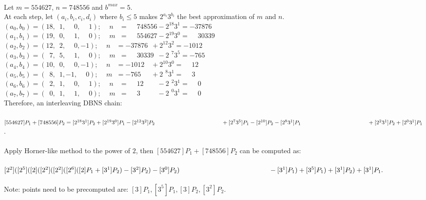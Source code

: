  \\
Let $m = 554627$, $n = 748556$ and $b^{max} = 5$. \\
At each step, let $(a_i,b_i,c_i,d_i)$ where $b_i \le 5$ makes $2^{a_i}3^{b_i}$ the best approximation of $m$ and $n$. \\
$(a_0,b_0) = (18,\phantom{0}1,\phantom{-}0,\phantom{-}1)$;		$\quad n\phantom{m} = \phantom{-}748556			- 2^{18}3^{1}		= -37876$ \\
$(a_1,b_1) = (19,\phantom{0}0,\phantom{-}1,\phantom{-}0)$;		$\quad m\phantom{n} = \phantom{-}554627			- 2^{19}3^{0}		= \phantom{-}30339$ \\
$(a_2,b_2) = (12,\phantom{0}2,\phantom{-}0,-1)$;			$\quad n\phantom{m} = -37876\phantom{0}			+ 2^{12}3^{2}		= -1012$ \\
$(a_3,b_3) = (\phantom{0}7,\phantom{0}5,\phantom{-}1,\phantom{-}0)$; 	$\quad m\phantom{n} = \phantom{-}30339\phantom{0}	- 2^{\phantom{0}7}3^{5} = -765$ \\
$(a_4,b_4) = (10,\phantom{0}0,\phantom{-}0,-1)$;			$\quad n\phantom{m}=  -1012\phantom{00}			+ 2^{10}3^{0}		= \phantom{-}12$ \\
$(a_5,b_5) = (\phantom{0}8,\phantom{0}1,-1,\phantom{-}0)$; 		$\quad m\phantom{n}=  -765\phantom{000}			+ 2^{\phantom{0}8}3^{1} = \phantom{-}3$ \\
$(a_6,b_6) = (\phantom{0}2,\phantom{0}1,\phantom{-}0,\phantom{-}1)$; 	$\quad n\phantom{m}= \phantom{-}12\phantom{0000}	- 2^{\phantom{0}2}3^{1} = \phantom{-}0$ \\
$(a_7,b_7) = (\phantom{0}0,\phantom{0}1,\phantom{-}1,\phantom{-}0)$; 	$\quad m\phantom{n}= \phantom{-}3\phantom{00000}	- 2^{\phantom{0}0}3^{1} = \phantom{-}0$ \\
Therefore, an interleaving DBNS chain: \\
\\
$[554627]P_1 + [748556]P_2 = [2^{18}3^{1}]P_2 + [2^{19}3^{0}]P_1 - [2^{12}3^{2}]P_2 \\
\phantom{[554627]P_1 + [748556]P_2 =}
			+ [2^{7}3^{5}]P_1 - [2^{10}]P_2 - [2^{8}3^{1}]P_1 \\
\phantom{[554627]P_1 + [748556]P_2 =}
			+ [2^{2}3^{1}]P_2 + [2^{0}3^{1}]P_1$. \\
\\
Apply Horner-like method to the power of $2$, then $[554627]P_1 + [748556]P_2$ can be computed as: \\
\\
$[2^2]([2^5]([2]([2^2]([2^2]([2^6]([2]P_1 + [3^1]P_2) - [3^2]P_2) - [3^0]P_2) \\
\phantom{[2^2]([2^5]([2]([2^2]([2^2]([2^6]([2]P_1}
- [3^1]P_1) + [3^5]P_1) + [3^1]P_2) + [3^1]P_1.$ \\
\\
Note: points need to be precomputed are: $[3]P_1, [3^5]P_1, [3]P_2, [3^2]P_2$. \\


